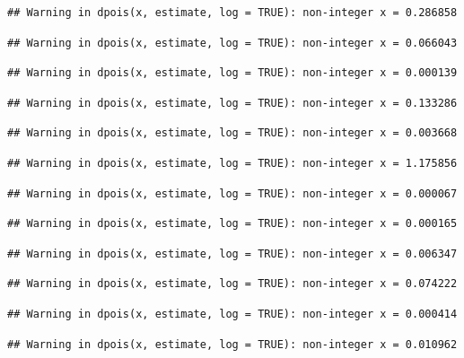 \documentclass[]{article}
\begin{document}
\begin{verbatim}
## Warning in dpois(x, estimate, log = TRUE): non-integer x = 0.286858
\end{verbatim}

\begin{verbatim}
## Warning in dpois(x, estimate, log = TRUE): non-integer x = 0.066043
\end{verbatim}

\begin{verbatim}
## Warning in dpois(x, estimate, log = TRUE): non-integer x = 0.000139
\end{verbatim}

\begin{verbatim}
## Warning in dpois(x, estimate, log = TRUE): non-integer x = 0.133286
\end{verbatim}

\begin{verbatim}
## Warning in dpois(x, estimate, log = TRUE): non-integer x = 0.003668
\end{verbatim}

\begin{verbatim}
## Warning in dpois(x, estimate, log = TRUE): non-integer x = 1.175856
\end{verbatim}

\begin{verbatim}
## Warning in dpois(x, estimate, log = TRUE): non-integer x = 0.000067
\end{verbatim}

\begin{verbatim}
## Warning in dpois(x, estimate, log = TRUE): non-integer x = 0.000165
\end{verbatim}

\begin{verbatim}
## Warning in dpois(x, estimate, log = TRUE): non-integer x = 0.006347
\end{verbatim}

\begin{verbatim}
## Warning in dpois(x, estimate, log = TRUE): non-integer x = 0.074222
\end{verbatim}

\begin{verbatim}
## Warning in dpois(x, estimate, log = TRUE): non-integer x = 0.000414
\end{verbatim}

\begin{verbatim}
## Warning in dpois(x, estimate, log = TRUE): non-integer x = 0.010962
\end{verbatim}
\end{document}
